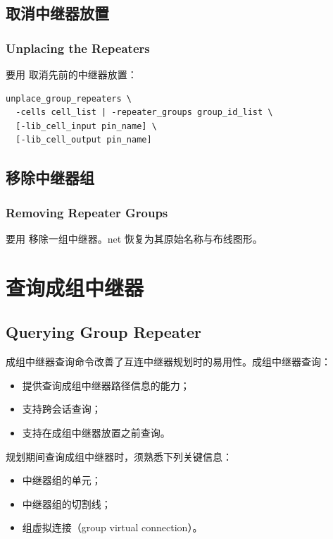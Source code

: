 \subsection{取消中继器放置}
\subsubsection*{Unplacing the Repeaters}

要用  取消先前的中继器放置：
\begin{lstlisting}
unplace_group_repeaters \
  -cells cell_list | -repeater_groups group_id_list \
  [-lib_cell_input pin_name] \
  [-lib_cell_output pin_name]
\end{lstlisting}

\subsection{移除中继器组}
\subsubsection*{Removing Repeater Groups}

要用  移除一组中继器。net 恢复为其原始名称与布线图形。

\section{查询成组中继器}
\subsection*{Querying Group Repeater}

成组中继器查询命令改善了互连中继器规划时的易用性。成组中继器查询：
\begin{itemize}
  \item 提供查询成组中继器路径信息的能力；
  \item 支持跨会话查询；
  \item 支持在成组中继器放置之前查询。
\end{itemize}

规划期间查询成组中继器时，须熟悉下列关键信息：
\begin{itemize}
  \item 中继器组的单元；
  \item 中继器组的切割线；
  \item 组虚拟连接（group virtual connection）。
\end{itemize}

